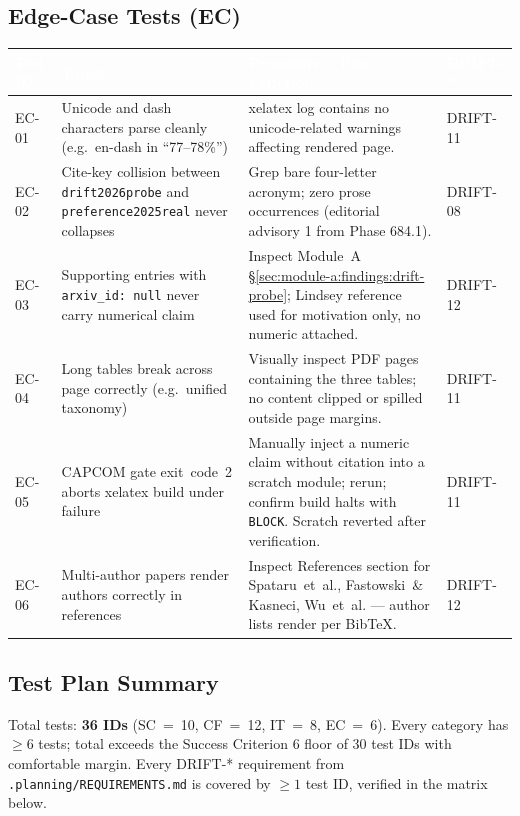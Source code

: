 \documentclass[11pt,letterpaper]{article}
\newcommand{\tableheader}[1]{\textbf{\sffamily\textcolor{white}{#1}}}
\begin{document}
\subsection{Edge-Case Tests (EC)}
\label{sec:test-plan:ec}

\begin{center}
\small
\begin{tabularx}{\textwidth}{L{1.8cm}L{4.4cm}XL{1.8cm}}
\toprule
{}
\tableheader{Test ID} & \tableheader{Target} & \tableheader{Procedure / Pass Criterion} & \tableheader{DRIFT-*} \\
\midrule
EC-01 & Unicode and dash characters parse cleanly (e.g.\ en-dash in ``77--78\%'') & xelatex log contains no unicode-related warnings affecting rendered page. & DRIFT-11 \\
EC-02 & Cite-key collision between \texttt{drift2026probe} and \texttt{preference2025real} never collapses & Grep bare four-letter acronym; zero prose occurrences (editorial advisory 1 from Phase 684.1). & DRIFT-08 \\
EC-03 & Supporting entries with \texttt{arxiv\_id: null} never carry numerical claim & Inspect Module~A \S\ref{sec:module-a:findings:drift-probe}; Lindsey reference used for motivation only, no numeric attached. & DRIFT-12 \\
EC-04 & Long tables break across page correctly (e.g.\ unified taxonomy) & Visually inspect PDF pages containing the three tables; no content clipped or spilled outside page margins. & DRIFT-11 \\
EC-05 & CAPCOM gate exit~code~2 aborts xelatex build under failure & Manually inject a numeric claim without citation into a scratch module; rerun; confirm build halts with \texttt{BLOCK}. Scratch reverted after verification. & DRIFT-11 \\
EC-06 & Multi-author papers render authors correctly in references & Inspect References section for Spataru~et~al., Fastowski~\& Kasneci, Wu~et~al. --- author lists render per BibTeX. & DRIFT-12 \\
\bottomrule
\end{tabularx}
\end{center}

\subsection{Test Plan Summary}
\label{sec:test-plan:summary}

Total tests: \textbf{36 IDs} (SC~=~10, CF~=~12, IT~=~8, EC~=~6). Every
category has $\geq 6$ tests; total exceeds the Success Criterion 6 floor of 30
test IDs with comfortable margin. Every DRIFT-* requirement from
\texttt{.planning/REQUIREMENTS.md} is covered by $\geq 1$ test ID, verified in
the matrix below.
\end{document}
